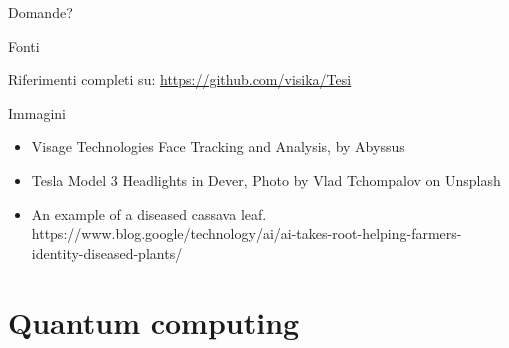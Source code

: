 \documentclass{beamer}
\begin{document}
    \begin{frame}[focus]
        Domande?
    \end{frame}

    \appendix

    \begin{frame}{Fonti}
        
        

        \vspace{.2cm}

        Riferimenti completi su: \url{https://github.com/visika/Tesi}
    \end{frame}

    \begin{frame}{Immagini}
        \begin{itemize}
            \item Visage Technologies Face Tracking and Analysis, by Abyssus
            \item Tesla Model 3 Headlights in Dever, Photo by Vlad Tchompalov on Unsplash
            \item An example of a diseased cassava leaf. https://www.blog.google/technology/ai/ai-takes-root-helping-farmers-identity-diseased-plants/
        \end{itemize}
    \end{frame}

    \section{Quantum computing}
\end{document}
